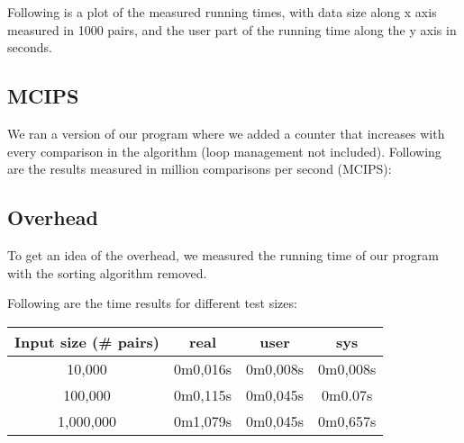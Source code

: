 \documentclass{article}
\begin{document}
Following is a plot of the measured running times, with data size along x axis measured in 1000 pairs, and the user part of the running time along the y axis in seconds. \newline
{}
\hskip 5pt

\subsection{MCIPS}
We ran a version of our program where we added a counter that increases with every comparison in the algorithm (loop management not included). Following are the results measured in million comparisons per second (MCIPS):
\hskip 5pt

\subsection{Overhead}
To get an idea of the overhead, we measured the running time of our program with the sorting algorithm removed.

Following are the time results for different test sizes:

\begin{center}
\begin{tabular}{||c c c c ||} 
 \hline
 Input size (\# pairs) & real & user & sys\\ [0.5ex] 
 \hline\hline
 10,000 & 0m0,016s & 0m0,008s & 0m0,008s  \\
 \hline
 100,000 & 0m0,115s & 0m0,045s & 0m0.07s \\
 \hline
 1,000,000 & 0m1,079s & 0m0,045s & 0m0,657s \\ [1ex] 
 \hline
\end{tabular}
\end{center}
\end{document}
